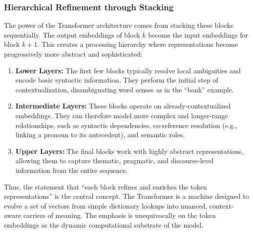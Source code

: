 \documentclass[%
  reprint,
  superscriptaddress,
  showpacs,
  showkeys,
  amsmath,amssymb,
  pra,
  longbibliography,
  floatfix,
  x11names
]{revtex4-2}
\begin{document}
\subsubsection{Hierarchical Refinement through Stacking}
The power of the Transformer architecture comes from stacking these blocks sequentially. The output embeddings of block $k$ become the input embeddings for block $k+1$. This creates a processing hierarchy where representations become progressively more abstract and sophisticated:
\begin{enumerate}
    \item \textbf{Lower Layers:} The first few blocks typically resolve local ambiguities and encode basic syntactic information. They perform the initial step of contextualization, disambiguating word senses as in the ``bank'' example.
    \item \textbf{Intermediate Layers:} These blocks operate on already-contextualized embeddings. They can therefore model more complex and longer-range relationships, such as syntactic dependencies, co-reference resolution (e.g., linking a pronoun to its antecedent), and semantic roles.
    \item \textbf{Upper Layers:} The final blocks work with highly abstract representations, allowing them to capture thematic, pragmatic, and discourse-level information from the entire sequence.
\end{enumerate}
Thus, the statement that ``each block refines and enriches the token representations'' is the central concept. The Transformer is a machine designed to evolve a set of vectors from simple dictionary lookups into nuanced, context-aware carriers of meaning. The emphasis is unequivocally on the token embeddings as the dynamic computational substrate of the model.
\end{document}
